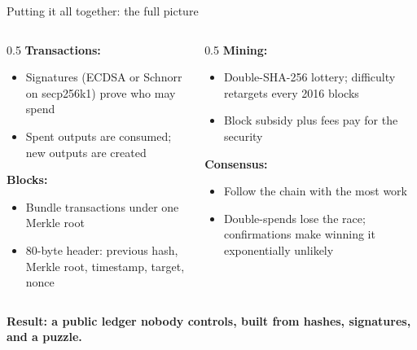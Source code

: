 \ifdefined\PRESENTATION\else\PassOptionsToClass{handout}{beamer}\fi\documentclass[aspectratio=169, lualatex]{beamer}
\begin{document}
\begin{frame}{Putting it all together: the full picture}
	\begin{columns}[c]
		\begin{column}{0.5\textwidth}
			\textbf{Transactions:}
			\begin{itemize}
				\item Signatures (ECDSA or Schnorr on secp256k1) prove who may spend
				\item Spent outputs are consumed; new outputs are created
			\end{itemize}
			\textbf{Blocks:}
			\begin{itemize}
				\item Bundle transactions under one Merkle root
				\item 80-byte header: previous hash, Merkle root, timestamp, target, nonce
			\end{itemize}
		\end{column}
		\begin{column}{0.5\textwidth}
			\textbf{Mining:}
			\begin{itemize}
				\item Double-SHA-256 lottery; difficulty retargets every 2016 blocks
				\item Block subsidy plus fees pay for the security
			\end{itemize}
			\textbf{Consensus:}
			\begin{itemize}
				\item Follow the chain with the most work
				\item Double-spends lose the race; confirmations make winning it exponentially unlikely
			\end{itemize}
		\end{column}
	\end{columns}
	\begin{center}
		\textbf{Result: a public ledger nobody controls, built from hashes, signatures, and a puzzle.}
	\end{center}
\end{frame}
\end{document}
